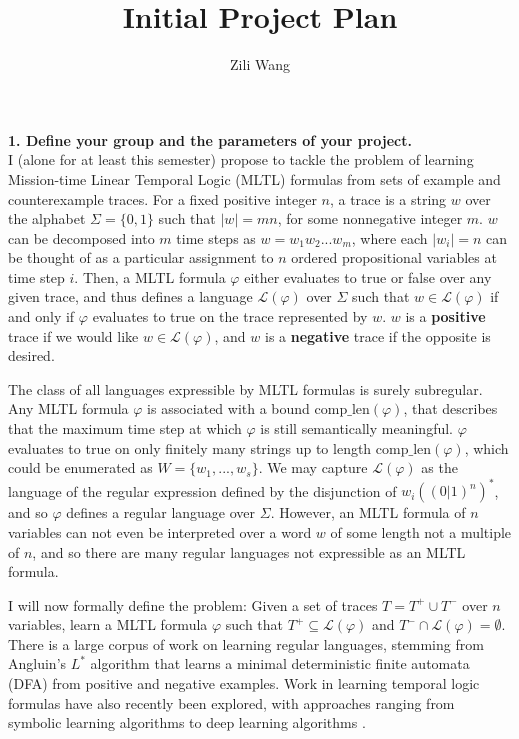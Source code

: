 \documentclass[12pt]{article}
\renewcommand{\phi}{\varphi}
\begin{document}
\title{Initial Project Plan}

\author{Zili Wang}

\maketitle
\noindent \textbf{1. Define your group and the parameters of your project.} \\

I (alone for at least this semester) propose to tackle the problem of learning Mission-time Linear Temporal Logic (MLTL) formulas from sets of example and counterexample traces. 
For a fixed positive integer $n$, a trace is a string $w$ over the alphabet $\Sigma = \{0, 1\}$ such that $|w| = mn$, for some nonnegative integer $m$. 
$w$ can be decomposed into $m$ time steps as $w = w_1 w_2 ... w_m$, where each $|w_i| = n$ can be thought of as a particular assignment to $n$ ordered propositional variables at time step $i$.
Then, a MLTL formula $\phi$ either evaluates to true or false over any given trace, and thus defines a language $\mathcal{L}(\phi)$ over $\Sigma$ such that $w \in \mathcal{L}(\phi)$ if and only if $\phi$ evaluates to true on the trace represented by $w$.
$w$ is a \textbf{positive} trace if we would like $w \in \mathcal{L}(\phi)$, and $w$ is a \textbf{negative} trace if the opposite is desired. 

The class of all languages expressible by MLTL formulas is surely subregular.
Any MLTL formula $\phi$ is associated with a bound $\text{comp\_len}(\phi)$, that describes that the maximum time step at which $\phi$ is still semantically meaningful. $\phi$ evaluates to true on only finitely many strings up to length $\text{comp\_len}(\phi)$, which could be enumerated as $W = \{w_1, ..., w_s\}$.
We may capture $\mathcal{L}(\phi)$ as the language of the regular expression defined by the disjunction of $w_i ((0 | 1)^n)^*$, and so $\phi$ defines a regular language over $\Sigma$. However, an MLTL formula of $n$ variables can not even be interpreted over a word $w$ of some length not a multiple of $n$, and so there are many regular languages not expressible as an MLTL formula. 

I will now formally define the problem: Given a set of traces $T = T^+ \cup T^-$ over $n$ variables, learn a MLTL formula $\phi$ such that $T^+ \subseteq \mathcal{L}(\phi)$ and $T^- \cap \mathcal{L}(\phi) = \emptyset$. There is a large corpus of work on learning regular languages, stemming from Angluin's $L^*$ algorithm \cite{ANGLUIN_Lstar} that learns a minimal deterministic finite automata (DFA) from positive and negative examples. Work in learning temporal logic formulas have also recently been explored, with approaches ranging from symbolic learning algorithms \cite{roy_ltlf_learning, camacho_ltlf_learning} to deep learning algorithms \cite{stl_learning, Luo_Liang_Du_Wan_Peng_Zhang_2022}.
\end{document}
